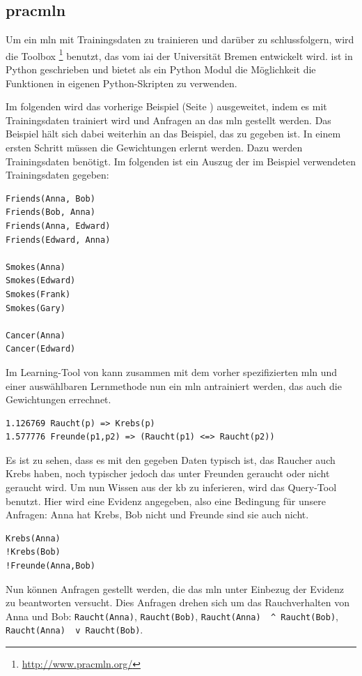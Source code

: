 \subsection{pracmln}
\label{subsec:pracmln}
Um ein \gls{mln} mit Trainingsdaten zu trainieren und darüber zu schlussfolgern, wird die Toolbox \pracmln\footnote{\url{http://www.pracmln.org/}} benutzt, das vom \gls{iai} der Universität Bremen entwickelt wird. \pracmln ist in Python geschrieben und bietet als ein Python Modul die Möglichkeit die Funktionen in eigenen Python-Skripten zu verwenden. \par 
Im folgenden wird das vorherige Beispiel (Seite \pageref{mlnexample}) ausgeweitet, indem es mit Trainingsdaten trainiert wird und Anfragen an das \gls{mln} gestellt werden. Das Beispiel hält sich dabei weiterhin an das Beispiel, das zu \pracmln gegeben ist.  \newline
In einem ersten Schritt müssen die Gewichtungen erlernt werden. Dazu werden Trainingsdaten benötigt. Im folgenden ist ein Auszug der im Beispiel verwendeten Trainingsdaten gegeben: 
\begin{lstlisting}[backgroundcolor=\color{backcolour}]
Friends(Anna, Bob)
Friends(Bob, Anna)
Friends(Anna, Edward)
Friends(Edward, Anna)  

Smokes(Anna)
Smokes(Edward)
Smokes(Frank)
Smokes(Gary)

Cancer(Anna)
Cancer(Edward)
\end{lstlisting}  
Im Learning-Tool von \pracmln kann zusammen mit dem vorher spezifizierten \gls{mln} und einer auswählbaren Lernmethode nun ein \gls{mln} antrainiert werden, das auch die Gewichtungen errechnet.     
\begin{lstlisting}[backgroundcolor=\color{backcolour}]
1.126769 Raucht(p) => Krebs(p)
1.577776 Freunde(p1,p2) => (Raucht(p1) <=> Raucht(p2))
\end{lstlisting}  
Es ist zu sehen, dass es mit den gegeben Daten typisch ist, das Raucher auch Krebs haben, noch typischer jedoch das unter Freunden geraucht oder nicht geraucht wird.\newline
Um nun Wissen aus der \gls{kb} zu inferieren, wird das Query-Tool benutzt. Hier wird eine Evidenz angegeben, also eine Bedingung für unsere Anfragen: Anna hat Krebs, Bob nicht und Freunde sind sie auch nicht. 
\begin{lstlisting}[backgroundcolor=\color{backcolour}]
Krebs(Anna)
!Krebs(Bob)
!Freunde(Anna,Bob)
\end{lstlisting} 
Nun können Anfragen gestellt werden, die das \gls{mln} unter Einbezug der Evidenz zu beantworten versucht. Dies Anfragen drehen sich um das Rauchverhalten von Anna und Bob: \lstinline[breaklines=true]{Raucht(Anna)}, \lstinline[breaklines=true]{Raucht(Bob)}, \lstinline[breaklines=true]{Raucht(Anna)  ^ Raucht(Bob)}, \lstinline[breaklines=true]{Raucht(Anna)  v Raucht(Bob)}. \newline
